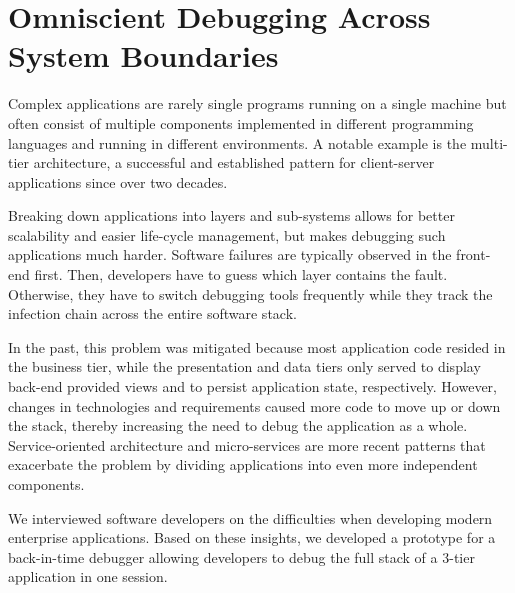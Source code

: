 \chapter{Omniscient Debugging Across System Boundaries}
\label{sec:stack_odb}


%

\tmpStart

Complex applications are rarely single programs running on a single machine but often consist of multiple components implemented in different programming languages and running in different environments.
A notable example is the multi-tier architecture, a successful and established pattern for client-server applications since over two decades.

Breaking down applications into layers and sub-systems allows for better scalability and easier life-cycle management, but makes debugging such applications much harder.
Software failures are typically observed in the front-end first.
Then, developers have to guess which layer contains the fault. 
Otherwise, they have to switch debugging tools frequently while they track the infection chain across the entire software stack.

In the past, this problem was mitigated because most application code resided in the business tier, while the presentation and data tiers only served to display back-end provided views and to persist application state, respectively.
However, changes in technologies and requirements caused more code to move up or down the stack, thereby increasing the need to debug the application as a whole.
Service-oriented architecture and micro-services are more recent patterns that exacerbate the problem by dividing applications into even more independent components.

We interviewed software developers on the difficulties when developing modern enterprise applications.
Based on these insights, we developed a prototype for a back-in-time debugger allowing developers to debug the full stack of a 3-tier application in one session.

